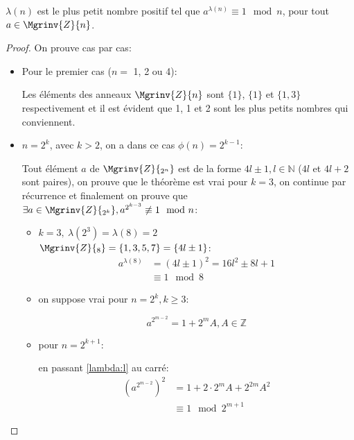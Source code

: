 		\begin{theorem}{$\lambda(n)$ est le plus petit nombre positif tel que $a^{\lambda(n)} \equiv 1 \mod{n}$, pour tout $a\in \Mgrinv{Z}{n}$.}
			\label{lambda:theo}
			\begin{proof}
				On prouve cas par cas:
				\begin{itemize}
					\item Pour le premier cas ($n =$ 1, 2 ou 4):

					        Les éléments des anneaux $\Mgrinv{Z}{n}$ sont $\{1\}$, $\{1\}$ et $\{1,3\}$ respectivement et il 
						est évident que 1, 1 et 2 sont les plus 
						petits nombres qui conviennent. 
					\item $n = 2^k$, avec $k > 2$, on a dans ce cas $\phi(n) = 2^{k-1}$:

						Tout élément $a$ de $\Mgrinv{Z}{_{2^n}}$ est de la forme $4l\pm 1, l \in \mathbb{N}$ ($4l$ et $4l+2$ sont paires),
						on prouve que le théorème est vrai pour $k = 3$, on continue par récurrence et 
						finalement on prouve que $\exists a \in \Mgrinv{Z}{_{2^k}}, a^{2^{k-3}} \not\equiv 1 \mod{n}$:
						\begin{itemize}
							\item $k = 3,~ \lambda(2^3) = \lambda(8) = 2$\\
								$\Mgrinv{Z}{_8} = \{1,3,5,7\} = \{4l\pm 1\}$:
								\begin{align*}
									a^{\lambda(8)}&=(4l\pm 1)^2 = 16l^2\pm8l+1\\
										&\equiv 1 \mod{8}
								\end{align*}
							\item on suppose vrai pour $n = 2^k, k \geq 3$:

								\begin{equation} \label{lambda:l}
									a^{2^{m-2}} = 1+2^mA, A\in\mathbb{Z}
								\end{equation}
							\item pour $n = 2^{k+1}$:

								en passant \ref{lambda:l} au carré:
								\begin{align}
									(a^{2^{m-2}})^2 &= 1+2\cdot 2^{m}A+2^{2m}A^2 \nonumber \\
											&\equiv 1 \mod{2^{m+1}}
								\end{align}
						\end{itemize}



\end{itemize}
\end{proof}
\end{theorem}
